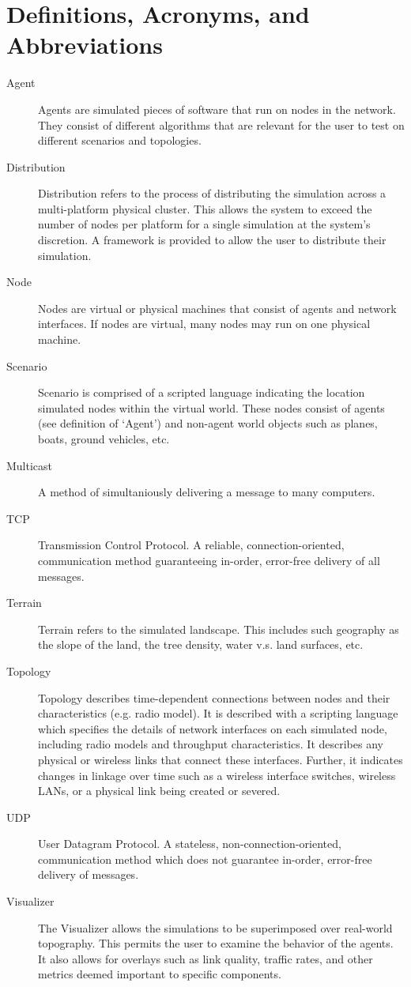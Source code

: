 \documentclass[titlepage]{article}
\begin{document}
\pagebreak
\appendix
\appendixpage

\section{Definitions, Acronyms, and Abbreviations}
\label{sec:glossary}
\begin{description}
\item[Agent]
	Agents are simulated pieces of software that run on nodes in the network. They consist of different algorithms that are relevant for the user to test on different scenarios and topologies.   
\item[Distribution]
	Distribution refers to the process of distributing the simulation across a multi-platform physical cluster.  This allows the system to exceed the number of nodes per platform for a single simulation at the system's discretion.  A framework is provided to allow the user to distribute their simulation. 	
\item[Node]
	Nodes are virtual or physical machines that consist of agents and network interfaces.  If nodes are virtual, many nodes may run on one physical machine.  
\item[Scenario]
	Scenario is comprised of a scripted language indicating the location simulated nodes within the virtual world. These nodes consist of agents (see definition of `Agent') and non-agent world objects such as planes, boats, ground vehicles, etc. 
\item[Multicast]
    A method of simultaniously delivering a message to many computers.
\item[TCP]
    Transmission Control Protocol.  A reliable, connection-oriented, communication method guaranteeing in-order, error-free delivery of all messages.
\item[Terrain]
	Terrain refers to the simulated landscape.  This includes such geography as the slope of the land, the tree density, water v.s. land surfaces, etc.
\item[Topology]
	Topology describes time-dependent connections between nodes and their characteristics (e.g. radio model). It is described with a scripting language which specifies the details of network interfaces on each simulated node, including radio models and throughput characteristics.  It describes any physical or wireless links that connect these interfaces.  Further, it indicates changes in linkage over time such as a wireless interface switches, wireless LANs, or a physical link being created or severed. 
\item[UDP]
    User Datagram Protocol.  A stateless, non-connection-oriented, communication method which does not guarantee in-order, error-free delivery of messages.
\item[Visualizer]
	The Visualizer allows the simulations to be superimposed over real-world topography.  This permits the user to examine the behavior of the agents.  It also allows for overlays such as link quality, traffic rates, and other metrics deemed important to specific components.
\end{description}
\end{document}

